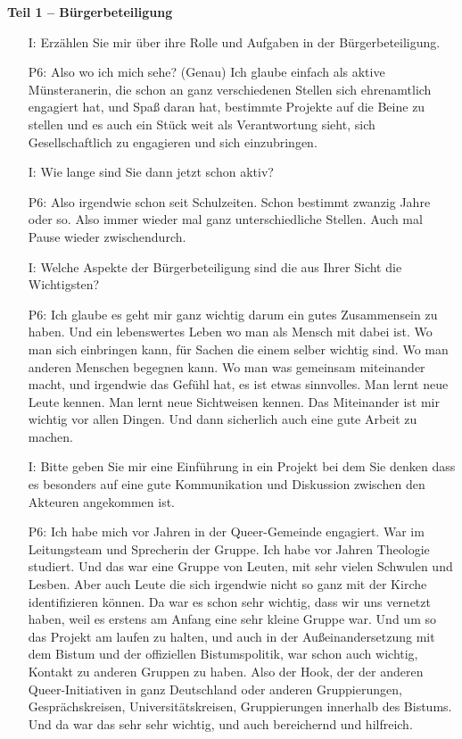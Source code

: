 \textbf{Teil 1 -- B{\"u}rgerbeteiligung}
\begin{itemize}
    \item[I:] Erz{\"a}hlen Sie mir {\"u}ber ihre Rolle und Aufgaben in der B{\"u}rgerbeteiligung.
    \item[P6:] Also wo ich mich sehe? (Genau) Ich glaube einfach als aktive M{\"u}nsteranerin, die schon an ganz verschiedenen Stellen sich ehrenamtlich engagiert hat, und Spa{\ss} daran hat, bestimmte Projekte auf die Beine zu stellen und es auch ein St{\"u}ck weit als Verantwortung sieht, sich Gesellschaftlich zu engagieren und sich einzubringen.
    \item[I:] Wie lange sind Sie dann jetzt schon aktiv?
    \item[P6:] Also irgendwie schon seit Schulzeiten. Schon bestimmt zwanzig Jahre oder so.	Also immer wieder mal ganz unterschiedliche Stellen. Auch mal Pause wieder zwischendurch.
    \item[I:] Welche Aspekte der B{\"u}rgerbeteiligung sind die aus Ihrer Sicht die Wichtigsten?
    \item[P6:] Ich glaube es geht mir ganz wichtig darum ein gutes Zusammensein zu haben. Und ein lebenswertes Leben wo man als Mensch mit dabei ist. Wo man sich einbringen kann, f{\"u}r Sachen die einem selber wichtig sind. Wo man anderen Menschen begegnen kann. Wo man was gemeinsam miteinander macht, und irgendwie das Gef{\"u}hl hat, es ist etwas sinnvolles. Man lernt neue Leute kennen. Man lernt neue Sichtweisen kennen. Das Miteinander ist mir wichtig vor allen Dingen. Und dann sicherlich auch eine gute Arbeit zu machen.
    \item[I:] Bitte geben Sie mir eine Einf{\"u}hrung in ein Projekt bei dem Sie denken dass es besonders auf eine gute Kommunikation und Diskussion zwischen den Akteuren angekommen ist.
    \item[P6:] Ich habe mich vor Jahren in der Queer-Gemeinde engagiert. War im Leitungsteam und Sprecherin der Gruppe. Ich habe vor Jahren Theologie studiert. Und das war eine Gruppe von Leuten, mit sehr vielen Schwulen und Lesben. Aber auch Leute die sich irgendwie nicht so ganz mit der Kirche identifizieren k{\"o}nnen. Da war es schon sehr wichtig, dass wir uns vernetzt haben, weil es erstens am Anfang eine sehr kleine Gruppe war. Und um so das Projekt am laufen zu halten, und auch in der Au{\ss}einandersetzung mit dem Bistum und der offiziellen Bistumspolitik, war schon auch wichtig, Kontakt zu anderen Gruppen zu haben. Also der Hook, der der anderen Queer-Initiativen in ganz Deutschland oder anderen Gruppierungen, Gespr{\"a}chskreisen, Universit{\"a}tskreisen, Gruppierungen innerhalb des Bistums. Und da war das sehr sehr wichtig, und auch bereichernd und hilfreich.

\end{itemize}

